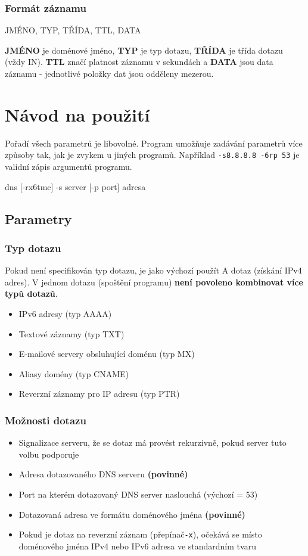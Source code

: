 \documentclass[a4paper,12pt]{article}
\begin{document}
\subsubsection{Formát záznamu}
\begin{cppcode}
JMÉNO, TYP, TŘÍDA, TTL, DATA
\end{cppcode}
\textbf{JMÉNO} je doménové jméno, \textbf{TYP} je typ dotazu, \textbf{TŘÍDA} je třída dotazu (vždy IN). \textbf{TTL} značí platnost záznamu v sekundách a \textbf{DATA} jsou data záznamu - jednotlivé položky dat jsou odděleny mezerou.

\newpage
\section{Návod na použití}
Pořadí všech parametrů je libovolné. Program umožňuje zadávání parametrů více způsoby tak, jak je zvykem u jiných programů. 
Například \texttt{-s8.8.8.8 -6rp 53} je validní zápis argumentů programu.
\begin{cppcode}
dns  [-rx6tmc] -s server [-p port] adresa
\end{cppcode}
\subsection{Parametry}
\subsubsection{Typ dotazu}
Pokud není specifikován typ dotazu, je jako výchozí použít A dotaz (získání IPv4 adres). V jednom dotazu (spoštění programu) \textbf{není povoleno kombinovat více typů dotazů}.
\begin{itemize}
	\item {}\qquad IPv6 adresy (typ AAAA)
	\item {}\qquad Textové záznamy (typ TXT)
	\item {}\qquad E-mailové servery obsluhující doménu (typ MX)
	\item {}\qquad Aliasy domény (typ CNAME)
	\item {}\qquad Reverzní záznamy pro IP adresu (typ PTR)
\end{itemize}
\subsubsection{Možnosti dotazu}
\begin{itemize}
	\item {}\quad Signalizace serveru, že se dotaz má provést rekurzivně, pokud server tuto volbu podporuje
	\item {}\quad Adresa dotazovaného DNS serveru \textbf{(povinné)}
	\item {}\quad Port na kterém dotazovaný DNS server naslouchá (výchozí = 53)
	\item {}\quad Dotazovaná adresa ve formátu doménového jména \textbf{(povinné)}	
	\item[]Pokud je dotaz na reverzní záznam (přepínač\texttt{-x}), očekává se místo doménového jména IPv4 nebo IPv6 adresa ve standardním tvaru
\end{itemize}
\end{document}
